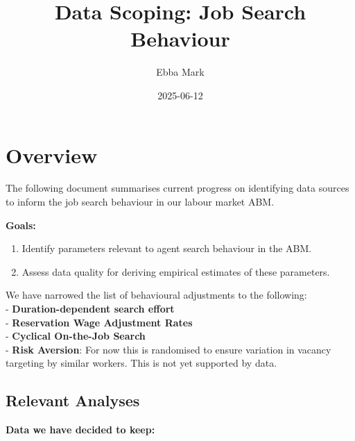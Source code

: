 \documentclass[
]{article}
\title{Data Scoping: Job Search Behaviour}
\author{Ebba Mark}
\date{2025-06-12}
\begin{document}
\maketitle

\section{Overview}\label{overview}

The following document summarises current progress on identifying data
sources to inform the job search behaviour in our labour market ABM.

\textbf{Goals:}

\begin{enumerate}
\def\labelenumi{\arabic{enumi}.}
\item
  Identify parameters relevant to agent search behaviour in the ABM.
\item
  Assess data quality for deriving empirical estimates of these
  parameters.
\end{enumerate}

We have narrowed the list of behavioural adjustments to the following:\\
- \textbf{Duration-dependent search effort}\\
- \textbf{Reservation Wage Adjustment Rates}\\
- \textbf{Cyclical On-the-Job Search}\\
- \textbf{Risk Aversion}: For now this is randomised to ensure variation
in vacancy targeting by similar workers. This is not yet supported by
data.

\subsection{\texorpdfstring{\textbf{Relevant
Analyses}}{Relevant Analyses}}\label{relevant-analyses}

\textbf{Data we have decided to keep:}
\end{document}

